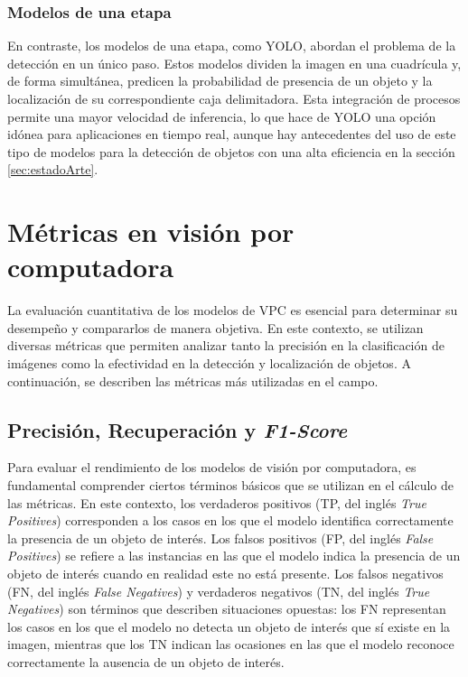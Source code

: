\subsubsection{Modelos de una etapa}

En contraste, los modelos de una etapa, como YOLO, abordan el problema de la detección en un único paso. Estos modelos dividen la imagen en una cuadrícula y, de forma simultánea, predicen la probabilidad de presencia de un objeto y la localización de su correspondiente caja delimitadora. Esta integración de procesos permite una mayor velocidad de inferencia, lo que hace de YOLO una opción idónea para aplicaciones en tiempo real, aunque hay antecedentes del uso de este tipo de modelos para la detección de objetos con una alta eficiencia en la sección \ref{sec:estadoArte}.


\section{Métricas en visión por computadora} \label{sec:metricasVisPC}

La evaluación cuantitativa de los modelos de VPC es esencial para determinar su desempeño y compararlos de manera objetiva. En este contexto, se utilizan diversas métricas que permiten analizar tanto la precisión en la clasificación de imágenes como la efectividad en la detección y localización de objetos. A continuación, se describen las métricas más utilizadas en el campo.

\subsection{Precisión, Recuperación y \textit{F1-Score}}

Para evaluar el rendimiento de los modelos de visión por computadora, es fundamental comprender ciertos términos básicos que se utilizan en el cálculo de las métricas. En este contexto, los verdaderos positivos (TP, del inglés \textit{True Positives}) corresponden a los casos en los que el modelo identifica correctamente la presencia de un objeto de interés. Los falsos positivos (FP, del inglés \textit{False Positives}) se refiere a las instancias en las que el modelo indica la presencia de un objeto de interés cuando en realidad este no está presente. Los falsos negativos (FN, del inglés \textit{False Negatives}) y verdaderos negativos (TN, del inglés \textit{True Negatives}) son términos que describen situaciones opuestas: los FN representan los casos en los que el modelo no detecta un objeto de interés que sí existe en la imagen, mientras que los TN indican las ocasiones en las que el modelo reconoce correctamente la ausencia de un objeto de interés.

